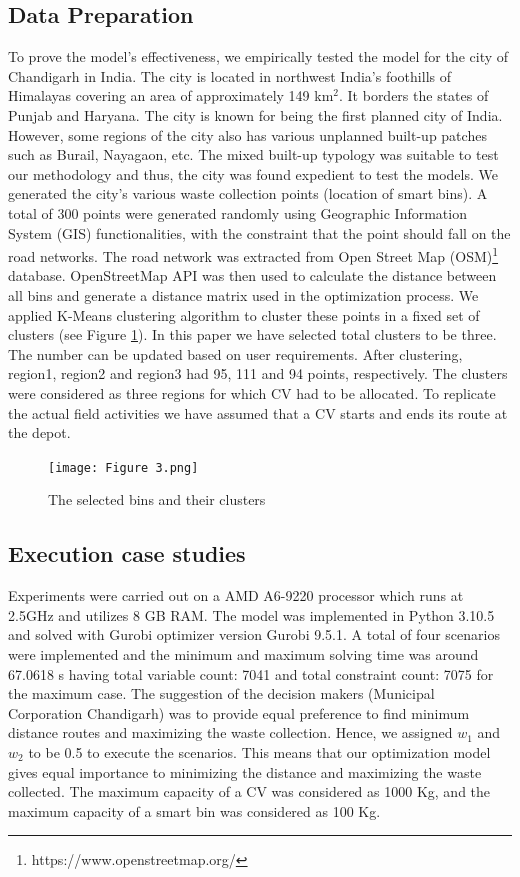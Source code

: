 \documentclass[12pt]{article}
\begin{document}
\subsection{Data Preparation}
To prove the model's effectiveness, we empirically tested the model for the city of Chandigarh in India. The city is located in northwest India's foothills of Himalayas covering an area of approximately 149 km$^2$. It borders the states of Punjab and Haryana. The city is known for being the first planned city of India. However, some regions of the city also has various unplanned built-up patches such as Burail, Nayagaon, etc. The mixed built-up typology was suitable to test our methodology and thus, the city was found expedient to test the models. We generated the city's various waste collection points (location of smart bins). A total of 300 points were generated randomly using Geographic Information System (GIS) functionalities, with the constraint that the point should fall on the road networks. The road network was extracted from Open Street Map (OSM)\footnote{https://www.openstreetmap.org/} database. OpenStreetMap API was then used to calculate the distance between all bins and generate a distance matrix used in the optimization process. We applied K-Means clustering algorithm to cluster these points in a fixed set of clusters (see Figure \ref{figm}). In this paper we have selected total clusters to be three. The number can be updated based on user requirements. After clustering, region1, region2 and region3 had 95, 111 and 94 points, respectively. The clusters were considered as three regions for which CV had to be allocated. To replicate the actual field activities we have assumed that a CV starts and ends its route at the depot.


\begin{figure}[H]
    \centering
    \texttt{[image: Figure 3.png]}
    \caption{The selected bins and their clusters}\label{figm}
\end{figure}

\subsection{Execution case studies}
Experiments were carried out on a AMD A6-9220 processor which runs at 2.5GHz and utilizes 8 GB RAM. The model was implemented in Python 3.10.5 and solved with Gurobi optimizer version Gurobi 9.5.1. A total of four scenarios were implemented and the minimum and maximum solving time was around 67.0618 s having total variable count: 7041 and total constraint count: 7075 for the maximum case.
The suggestion of the decision makers (Municipal Corporation Chandigarh) was to provide equal preference to find minimum distance routes and maximizing the waste collection. Hence, we assigned  $w_1$ and $w_2$ to be 0.5 to execute the scenarios. This means that our optimization model gives equal importance to minimizing the distance and maximizing the waste collected. The maximum capacity of a CV was considered as 1000 Kg, and the maximum capacity of a smart bin was considered as 100 Kg.
\end{document}
